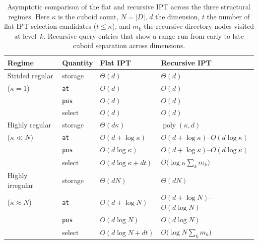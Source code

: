 \documentclass[manuscript,screen,review]{acmart}
\theoremstyle{definition}
\theoremstyle{plain}
\begin{document}
\begin{table}[ht]
\caption{Asymptotic comparison of the flat and recursive IPT across
  the three structural regimes. Here $\kappa$ is the cuboid count,
  $N=|D|$, $d$ the dimension, $t$ the number of flat-IPT selection
  candidates ($t\le\kappa$), and $m_k$ the recursive directory nodes
  visited at level~$k$. Recursive query entries that show a range run
  from early to late cuboid separation across dimensions.}
\label{table:flat-vs-recursive}
\begin{tabular}{llll}
\toprule
Regime & Quantity & Flat IPT & Recursive IPT \\
\midrule
Strided regular
  & storage & $\Theta(d)$ & $\Theta(d)$ \\
($\kappa=1$)
  & \texttt{at}     & $O(d)$ & $O(d)$ \\
  & \texttt{pos}    & $O(d)$ & $O(d)$ \\
  & select          & $O(d)$ & $O(d)$ \\
\midrule
Highly regular
  & storage & $\Theta(d\kappa)$ & $\operatorname{poly}(\kappa,d)$ \\
($\kappa\ll N$)
  & \texttt{at}  & $O(d{+}\log\kappa)$
                 & $O(d{+}\log\kappa)$–$O(d\log\kappa)$ \\
  & \texttt{pos} & $O(d\log\kappa)$
                 & $O(d{+}\log\kappa)$–$O(d\log\kappa)$ \\
  & select       & $O(d\log\kappa{+}dt)$
                 & $O\!\bigl(\log\kappa\textstyle\sum_k m_k\bigr)$ \\
\midrule
Highly irregular
  & storage & $\Theta(dN)$ & $\Theta(dN)$ \\
($\kappa\approx N$)
  & \texttt{at}  & $O(d{+}\log N)$
                 & $O(d{+}\log N)$–$O(d\log N)$ \\
  & \texttt{pos} & $O(d\log N)$ & $O(d\log N)$ \\
  & select       & $O(d\log N{+}dt)$
                 & $O\!\bigl(\log N\textstyle\sum_k m_k\bigr)$ \\
\bottomrule
\end{tabular}
\end{table}
\end{document}
